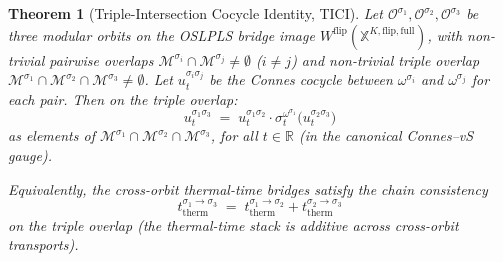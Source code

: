 \documentclass[11pt,a4paper]{article}
\theoremstyle{plain}
\newtheorem{theorem}{Theorem}[section]
\theoremstyle{definition}
\newcommand{\Mcal}{\mathcal{M}}
\newcommand{\Ocal}{\mathcal{O}}
\newcommand{\R}{\mathbb{R}}
\newcommand{\Wflip}{W^{\mathrm{flip}}}
\newcommand{\osXkrein}{\mathbb{X}^{K,\mathrm{flip},\mathrm{full}}}
\newcommand{\Morb}[1]{\Mcal^{\sigma_{#1}}}
\newcommand{\Oorb}[1]{\Ocal^{\sigma_{#1}}}
\newcommand{\omegaOrb}[1]{\omega^{\sigma_{#1}}}
\newcommand{\cocyc}[2]{u_{t}^{\sigma_{#1}\sigma_{#2}}}
\begin{document}
\begin{theorem}[Triple-Intersection Cocycle Identity, TICI]
\label{thm:tici}
Let $\Oorb{1},\Oorb{2},\Oorb{3}$ be three modular orbits on the OSLPLS
bridge image $\Wflip(\osXkrein)$, with non-trivial pairwise overlaps
$\Morb{i}\cap\Morb{j}\ne\emptyset$ ($i\ne j$) and non-trivial triple
overlap $\Morb{1}\cap\Morb{2}\cap\Morb{3}\ne\emptyset$. Let
$\cocyc{i}{j}$ be the Connes cocycle between $\omegaOrb{i}$ and
$\omegaOrb{j}$ for each pair. Then on the triple overlap:
\begin{equation}
  \cocyc{1}{3} \;=\; \cocyc{1}{2}\cdot\sigma_{t}^{\omegaOrb{1}}\!\big(\cocyc{2}{3}\big)
  \label{eq:tici}
\end{equation}
as elements of $\Morb{1}\cap\Morb{2}\cap\Morb{3}$, for all $t\in\R$
(in the canonical Connes--vS gauge).

Equivalently, the cross-orbit thermal-time bridges satisfy the chain
consistency
\begin{equation}
  t_{\mathrm{therm}}^{\sigma_{1}\to\sigma_{3}} \;=\; t_{\mathrm{therm}}^{\sigma_{1}\to\sigma_{2}} + t_{\mathrm{therm}}^{\sigma_{2}\to\sigma_{3}}
  \label{eq:thermal_chain_consistency}
\end{equation}
on the triple overlap (the thermal-time stack is \emph{additive}
across cross-orbit transports).
\end{theorem}
\end{document}
